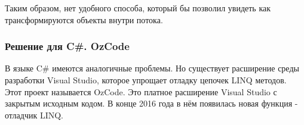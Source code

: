 Таким образом, нет удобного способа, который бы позволил увидеть как трансформируются объекты внутри потока.

\subsubsection{Решение для C\#. OzCode}
В языке C\# имеются аналогичные проблемы. Но существует расширение среды разработки Visual Studio, которое упрощает отладку цепочек LINQ методов. Этот проект называется OzCode. Это платное расширение Visual Studio с закрытым исходным кодом. В конце 2016 года в нём появилась новая функция - отладчик LINQ. 





